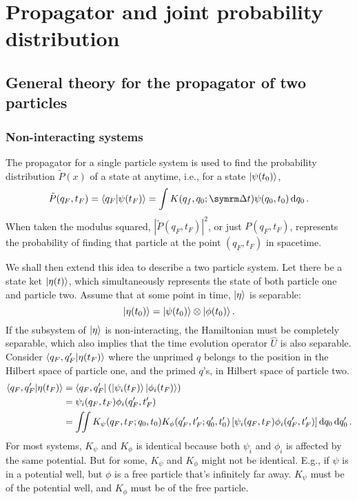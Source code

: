 \chapter{Propagator and joint probability distribution}

\section{General theory for the propagator of two particles}

\subsection{Non-interacting systems}

The propagator for a single particle system is used to find the probability distribution $\tilde{P}(x)$ of a state at anytime, i.e., for a state $\ket{\psi(t_0)}$,
\begin{equation}
    \tilde{P}(q_F, t_F) = \braket{q_F}{\psi(t_F)} = \int K(q_f, q_0; \Dd{t})\psi(q_0, t_0)\dd{q_0}.
\end{equation}
When taken the modulus squared, $|\tilde{P}(q_F, t_F)|^2$, or just $P(q_F, t_F)$, represents the probability of finding that particle at the point $(q_F, t_F)$ in spacetime.

We shall then extend this idea to describe a two particle system. Let there be a state ket $\ket{\eta(t)}$, which simultaneously represents the state of both particle one and particle two. Assume that at some point in time, $\ket{\eta}$ is separable:
\begin{equation}
    \ket{\eta(t_0)} = \ket{\psi(t_0)} \otimes \ket{\phi(t_0)}.
\end{equation}
If the subsystem of $\ket{\eta}$ is non-interacting, the Hamiltonian must be completely separable, which also implies that the time evolution operator $\hat{U}$ is also separable. Consider $\braket{q_F, q_F'}{\eta(t_F)}$ where the unprimed $q$ belongs to the position in the Hilbert space of particle one, and the primed $q$'s, in Hilbert space of particle two.
\begin{align*}
    \braket{q_F, q_F'}{\eta(t_F)} &= \bra{q_F, q_F'}\left(\ket{\psi_i(t_F)}\ket{\phi_i(t_F)}\right) \\
    &= \psi_i(q_F, t_F)\phi_i(q_F', t_F') \\
    &= \iint K_{\psi}(q_F, t_F; q_0, t_0)K_{\phi}(q_F', t_F'; q_0', t_0')\left[\psi_i(q_F, t_F)\phi_i(q_F', t_F')\right] \dd{q_0}\dd{q_0'}.
\end{align*}
For most systems, $K_{\psi}$ and $K_{\phi}$ is identical because both $\psi_i$ and $\phi_i$ is affected by the same potential. But for some, $K_{\psi}$ and $K_{\phi}$ might not be identical. E.g., if $\psi$ is in a potential well, but $\phi$ is a free particle that's infinitely far away. $K_{\psi}$ must be of the potential well, and $K_{\phi}$ must be of the free particle.

